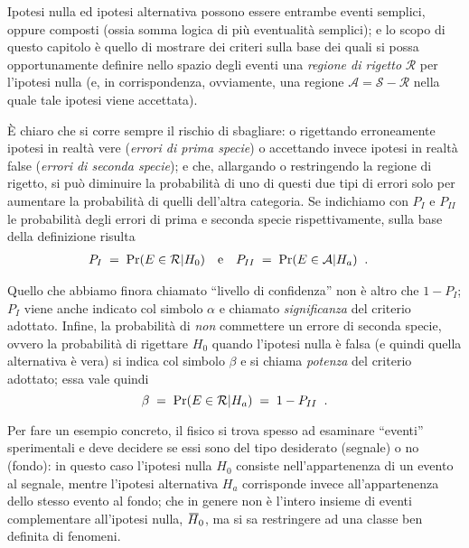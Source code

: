 Ipotesi nulla ed ipotesi alternativa possono essere entrambe
eventi semplici, oppure composti (ossia somma logica di
pi\`u eventualit\`a semplici); e lo scopo di questo capitolo
\`e quello di mostrare dei criteri sulla base dei quali si
possa opportunamente definire nello spazio degli eventi una
\emph{regione di rigetto} $\mathcal{R}$ per l'ipotesi nulla
(e, in corrispondenza, ovviamente, una regione $\mathcal{A}
= \mathcal{S} - \mathcal{R}$ nella quale tale ipotesi viene
accettata).

\`E chiaro che si corre sempre il rischio di sbagliare: o
rigettando erroneamente ipotesi in realt\`a vere
(\emph{errori di prima specie})%
o accettando invece ipotesi in realt\`a false (\emph{errori
di seconda specie});%
e che, allargando o restringendo la regione di rigetto, si
pu\`o diminuire la probabilit\`a di uno di questi due tipi
di errori solo per aumentare la probabilit\`a di quelli
dell'altra categoria.  Se indichiamo con $P_I$ e $P_{II}$ le
probabilit\`a degli errori di prima e seconda specie
rispettivamente, sulla base della definizione risulta
\begin{align*}
  P_I \; &= \; \Pr( E \in \mathcal{R} | H_0 )
  &&\text{e} &
  P_{II} \; &= \; \Pr( E \in \mathcal{A} | H_a ) \;\; .
\end{align*}

Quello che abbiamo finora chiamato ``livello di confidenza''
non \`e altro che $1 - P_I$; $P_I$ viene anche indicato col
simbolo $\alpha$ e chiamato \emph{significanza}%
del criterio adottato.  Infine, la probabilit\`a di
\emph{non} commettere un errore di seconda specie, ovvero la
probabilit\`a di rigettare $H_0$ quando l'ipotesi nulla \`e
falsa (e quindi quella alternativa \`e vera) si indica col
simbolo $\beta$ e si chiama \emph{potenza}%
del criterio adottato; essa vale quindi
\begin{equation*}
  \beta \; = \; \Pr( E \in \mathcal{R} | H_a ) \; = \; 1 -
  P_{II} \;\; .
\end{equation*}

Per fare un esempio concreto, il fisico si trova spesso ad
esaminare ``eventi'' sperimentali e deve decidere se essi
sono del tipo desiderato (segnale) o no (fondo): in questo
caso l'ipotesi nulla $H_0$ consiste nell'appartenenza di un
evento al segnale, mentre l'ipotesi alternativa $H_a$
corrisponde invece all'appartenenza dello stesso evento al
fondo; che in genere non \`e l'intero insieme di eventi
complementare all'ipotesi nulla, $\ob{H}_0$, ma si sa
restringere ad una classe ben definita di fenomeni.

